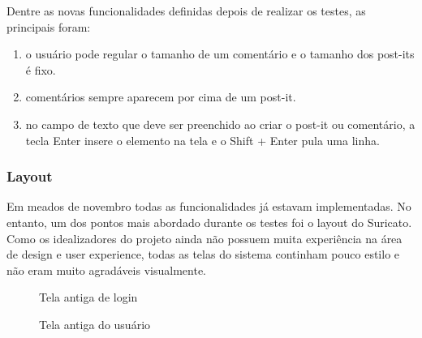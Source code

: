 Dentre as novas funcionalidades definidas depois de realizar os testes, as principais foram:

\begin{enumerate}
	\item o usuário pode regular o tamanho de um comentário e o tamanho dos post-its é fixo.
	\item comentários sempre aparecem por cima de um post-it.
	\item no campo de texto que deve ser preenchido ao criar o post-it ou comentário, a tecla Enter insere o elemento na tela e o Shift + Enter pula uma linha.
\end{enumerate}

\subsubsection*{Layout}

Em meados de novembro todas as funcionalidades já estavam implementadas. No entanto, um dos pontos mais abordado durante os testes foi o layout do Suricato. Como os idealizadores do projeto ainda não possuem muita experiência na área de design e user experience, todas as telas do sistema continham pouco estilo e não eram muito agradáveis visualmente.

\begin{figure}[H]
  \centering
  \caption{Tela antiga de login}\label{figura:loginAntigo}
\end{figure}

\begin{figure}[H]
  \centering
  \caption{Tela antiga do usuário}\label{figura:indexAntigo}
\end{figure}

